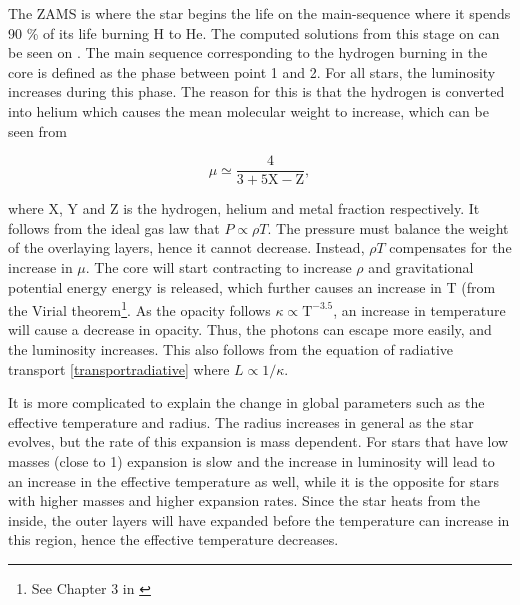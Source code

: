 The ZAMS is where the star begins the life on the main-sequence where it spends 90 \% of its life burning H to He. The computed solutions from this stage on can be seen on . The main sequence corresponding to the hydrogen burning in the core is defined as the phase between point 1 and 2. For all stars, the luminosity increases during this phase. The reason for this is that the hydrogen is converted into helium which causes the mean molecular weight to increase, which can be seen from

\begin{equation}
\label{meanmol}
\mu \simeq \frac{4}{3+5\text{X}-\text{Z}},
\end{equation}


\noindent where X, Y and Z is the hydrogen, helium and metal fraction respectively. It follows from the ideal gas law that $P \propto \rho T$. The pressure must balance the weight of the overlaying layers, hence it cannot decrease. Instead, $\rho T$ compensates for the increase in $\mu$. The core will start contracting to increase $\rho$ and gravitational potential energy energy is released, which further causes an increase in T (from the Virial theorem\footnote{See Chapter 3 in \citet{kippenhahn1990stellar}}. As the opacity follows $\kappa \propto \text{T}^{-3.5}$, an increase in temperature will cause a decrease in opacity. Thus, the photons can escape more easily, and the luminosity increases. This also follows from the equation of radiative transport \eqref{transportradiative} where $L\propto 1/\kappa$.

It is more complicated to explain the change in global parameters such as the effective temperature and radius. The radius increases in general as the star evolves, but the rate of this expansion is mass dependent. For stars that have low masses (close to 1\msun ) expansion is slow and the increase in luminosity will lead to an increase in the effective temperature as well, while it is the opposite for stars with higher masses and higher expansion rates. Since the star heats from the inside, the outer layers will have expanded before the temperature can increase in this region, hence the effective temperature decreases. 


